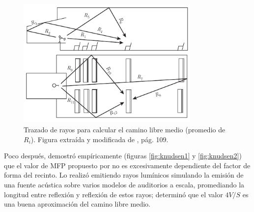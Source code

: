 \begin{figure}[ht]
    \centering
    \includegraphics[width=0.8\textwidth]{archivos/mfp.pdf}
    \caption{Trazado de rayos para calcular el camino libre medio (promedio de $R_i$). Figura extraída y modificada de \cite{Self2009}, pág. 109.}
\end{figure}

Poco después, \cite{Knudsen1932} demostró empíricamente (figuras \ref{fig:knudsen1} y \ref{fig:knudsen2}) que el valor de MFP propuesto por \citeauthor{jager1911theorie} no es excesivamente dependiente del factor de forma del recinto. Lo realizó emitiendo rayos lumínicos simulando la emisión de una fuente acústica sobre varios modelos de auditorios a escala, promediando la longitud entre reflexión y reflexión de estos rayos; determinó que el valor $4V/S$ es una buena aproximación del camino libre medio.
 
